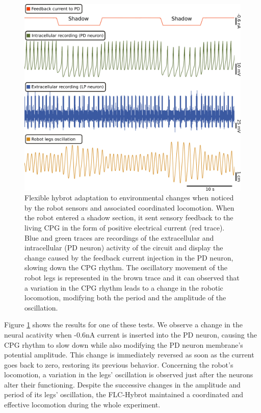 \begin{figure}[hbt!]
	\begin{center}
		\includegraphics[width=0.8\linewidth]{./img/invariants/robot/robot_results_validation}
	\end{center}
	\caption{Flexible hybrot adaptation to environmental changes when noticed by the robot sensors and associated coordinated locomotion. When the robot entered a shadow section, it sent sensory feedback to the living CPG in the form of positive electrical current (red trace). Blue and green traces are recordings of the extracellular and intracellular (PD neuron) activity of the circuit and display the change caused by the feedback current injection in the PD neuron, slowing down the CPG rhythm. The oscillatory movement of the robot legs is represented in the brown trace and it can observed that a variation in the CPG rhythm leads to a change in the robotic locomotion, modifying both the period and the amplitude of the oscillation. 
	}
	\label{fig:robot_results_validation}
\end{figure}

Figure \ref{fig:robot_results_validation} shows the results for one of these tests. We observe a change in  the neural acativity when -0.6nA current is inserted into the PD neuron, causing the CPG rhythm to slow down while also modifying the PD neuron membrane's potential amplitude. This change is immediately reversed as soon as the current goes back to zero, restoring its previous behavior. Concerning the robot's locomotion, a variation in the legs' oscillation is observed just after the neurons alter their functioning. Despite the successive changes in the amplitude and period of its legs' oscillation, the FLC-Hybrot maintained a coordinated and effective locomotion during the whole experiment. 

